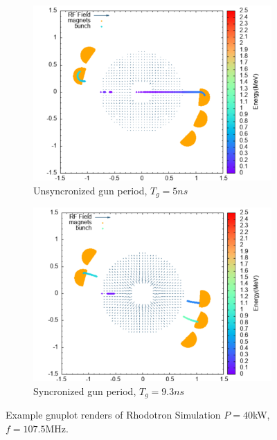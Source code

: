 \documentclass[a4paper,oneside,12pt]{report}
\numberwithin{equation}{chapter}
\begin{document}
{\iffalse \begin{figure}[H]
    \centering
    \begin{subfigure}{0.9\textwidth}
        \centering
        \includegraphics[width=\linewidth]{./figures/rhodoSim/5ns_gnuplot.png}
        \caption*{Unsyncronized \e gun period, $T_g = 5ns$}
    \end{subfigure}
    \begin{subfigure}{0.9\textwidth}
        \centering
        \includegraphics[width=\linewidth]{./figures/rhodoSim/9_3ns_gnuplot.png}
        \caption*{Syncronized \e gun period, $T_g = 9.3ns$}
    \end{subfigure}
    \caption{Example gnuplot renders of Rhodotron Simulation $P=40$kW, $f=107.5$MHz.}

\end{figure}}
\end{document}
